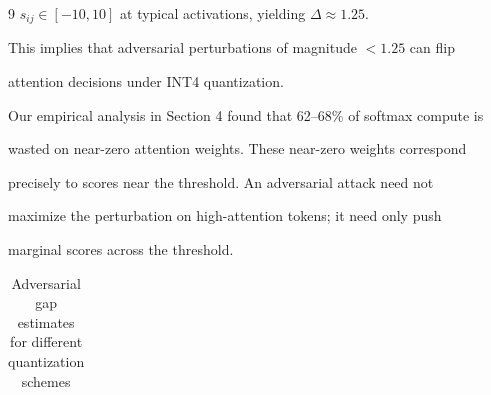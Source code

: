 \documentclass[11pt]{article}
\theoremstyle{definition}
\begin{document}
\begin{thebibliography}{9}
$s_{ij} \in [-10, 10]$ at typical activations, yielding $\Delta \approx 1.25$.






This implies that adversarial perturbations of magnitude $<1.25$ can flip






attention decisions under INT4 quantization.













Our empirical analysis in Section 4 found that 62--68\% of softmax compute is






wasted on near-zero attention weights.  These near-zero weights correspond






precisely to scores near the threshold.  An adversarial attack need not






maximize the perturbation on high-attention tokens; it need only push






marginal scores across the threshold.













\begin{table}[t]






\caption{Adversarial gap estimates for different quantization schemes}






\label{tab:adv-gap}






\begin{center}






\begin{tabular}{lccc}







\end{tabular}
\end{center}
\end{table}
\end{thebibliography}
\end{document}
